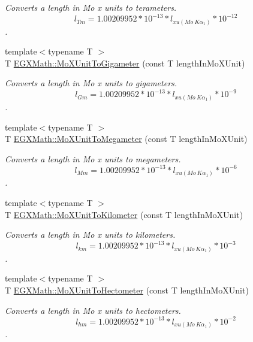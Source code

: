 \begin{DoxyCompactItemize}
\begin{DoxyCompactList}\small\item\em Converts a length in Mo x units to terameters. \[ l_{Tm}=1.00209952*10^{-13} * l_{xu(Mo\ K\alpha_1)} * 10^{-12} \]. \end{DoxyCompactList}\item 
{\footnotesize template$<$typename T $>$ }\\T \mbox{\hyperlink{group___e_g_x_math-_conversions-_length_conversions-_non-_s_i-_mo_x_unit-_s_i_gacb9954e25799b5b7963fd492ceae5363}{E\+G\+X\+Math\+::\+Mo\+X\+Unit\+To\+Gigameter}} (const T length\+In\+Mo\+X\+Unit)
\begin{DoxyCompactList}\small\item\em Converts a length in Mo x units to gigameters. \[ l_{Gm}=1.00209952*10^{-13} * l_{xu(Mo\ K\alpha_1)} * 10^{-9} \]. \end{DoxyCompactList}\item 
{\footnotesize template$<$typename T $>$ }\\T \mbox{\hyperlink{group___e_g_x_math-_conversions-_length_conversions-_non-_s_i-_mo_x_unit-_s_i_ga97f86b6fb3faf5d48cacf99d7aa309d4}{E\+G\+X\+Math\+::\+Mo\+X\+Unit\+To\+Megameter}} (const T length\+In\+Mo\+X\+Unit)
\begin{DoxyCompactList}\small\item\em Converts a length in Mo x units to megameters. \[ l_{Mm}=1.00209952*10^{-13} * l_{xu(Mo\ K\alpha_1)} * 10^{-6} \]. \end{DoxyCompactList}\item 
{\footnotesize template$<$typename T $>$ }\\T \mbox{\hyperlink{group___e_g_x_math-_conversions-_length_conversions-_non-_s_i-_mo_x_unit-_s_i_ga1653c86da24ce9e73f72f67eb9595c2e}{E\+G\+X\+Math\+::\+Mo\+X\+Unit\+To\+Kilometer}} (const T length\+In\+Mo\+X\+Unit)
\begin{DoxyCompactList}\small\item\em Converts a length in Mo x units to kilometers. \[ l_{km}=1.00209952*10^{-13} * l_{xu(Mo\ K\alpha_1)} * 10^{-3} \]. \end{DoxyCompactList}\item 
{\footnotesize template$<$typename T $>$ }\\T \mbox{\hyperlink{group___e_g_x_math-_conversions-_length_conversions-_non-_s_i-_mo_x_unit-_s_i_ga2114fcf66c72ded7cdfdb5fe0d574e92}{E\+G\+X\+Math\+::\+Mo\+X\+Unit\+To\+Hectometer}} (const T length\+In\+Mo\+X\+Unit)
\begin{DoxyCompactList}\small\item\em Converts a length in Mo x units to hectometers. \[ l_{hm}=1.00209952*10^{-13} * l_{xu(Mo\ K\alpha_1)} * 10^{-2} \]. \end{DoxyCompactList}\item 

\end{DoxyCompactItemize}
